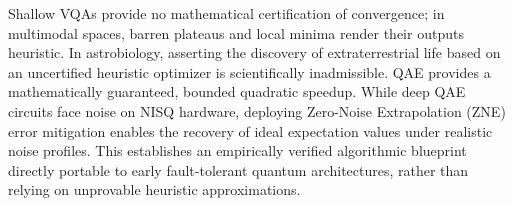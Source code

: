 Shallow VQAs provide no mathematical certification of convergence; in multimodal spaces, barren plateaus and local minima render their outputs heuristic. In astrobiology, asserting the discovery of extraterrestrial life based on an uncertified heuristic optimizer is scientifically inadmissible. QAE provides a mathematically guaranteed, bounded quadratic speedup. While deep QAE circuits face noise on NISQ hardware, deploying Zero-Noise Extrapolation (ZNE) error mitigation \cite{temme2017, endo2018} enables the recovery of ideal expectation values under realistic noise profiles. This establishes an empirically verified algorithmic blueprint directly portable to early fault-tolerant quantum architectures, rather than relying on unprovable heuristic approximations.
